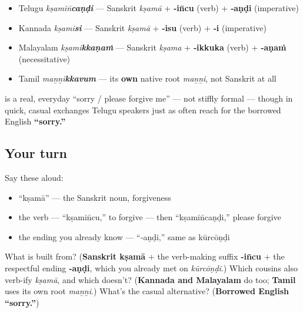 \begin{cousinweb}
\begin{itemize}
\raggedright
  \item Telugu \textbf{} \emph{kṣamin̄\textbf{caṇḍi}} — Sanskrit \emph{kṣamā} + \textbf{‑in̄cu} (verb) + \textbf{‑aṇḍi} (imperative)
  \item Kannada \textbf{} \emph{kṣami\textbf{si}} — Sanskrit \emph{kṣamā} + \textbf{‑isu} (verb) + \textbf{‑i} (imperative)
  \item Malayalam \textbf{} \emph{kṣami\textbf{kkaṇaṁ}} — Sanskrit \emph{kṣama} + \textbf{‑ikkuka} (verb) + \textbf{‑aṇaṁ} (necessitative)
  \item Tamil \textbf{} \emph{maṉṉi\textbf{kkavum}} — its \textbf{own} native root \emph{maṉṉi}, not Sanskrit at all
\end{itemize}
\end{cousinweb}

\begin{culture}
\textbf{} is a real, everyday \textquotedblleft{}sorry / please forgive me\textquotedblright{} — not stiffly formal — though in quick, casual exchanges Telugu speakers just as often reach for the borrowed English \textbf{\textquotedblleft{}sorry.\textquotedblright{}}
\end{culture}

\subsection*{Your turn}
Say these aloud:

\begin{itemize}
\raggedright
  \item \textquotedblleft{}kṣamā\textquotedblright{} — the Sanskrit noun, forgiveness
  \item the verb — \textquotedblleft{}kṣamin̄cu,\textquotedblright{} to forgive — then \textquotedblleft{}kṣamin̄caṇḍi,\textquotedblright{} please forgive
  \item the ending you already know — \textquotedblleft{}‑aṇḍi,\textquotedblright{} same as kūrcōṇḍi
\end{itemize}

\begin{tcolorbox}[breakable,colback=teal!4,colframe=teal!35!black,title={Before you move on}]
What is \textbf{} built from? (\textbf{Sanskrit kṣamā} + the verb-making suffix \textbf{‑in̄cu} + the respectful ending \textbf{‑aṇḍi}, which you already met on \emph{kūrcōṇḍi}.) Which cousins also verb-ify \emph{kṣamā}, and which doesn't? (\textbf{Kannada and Malayalam} do too; \textbf{Tamil} uses its own root \emph{maṉṉi}.) What's the casual alternative? (\textbf{Borrowed English \textquotedblleft{}sorry.\textquotedblright{}})
\end{tcolorbox}
